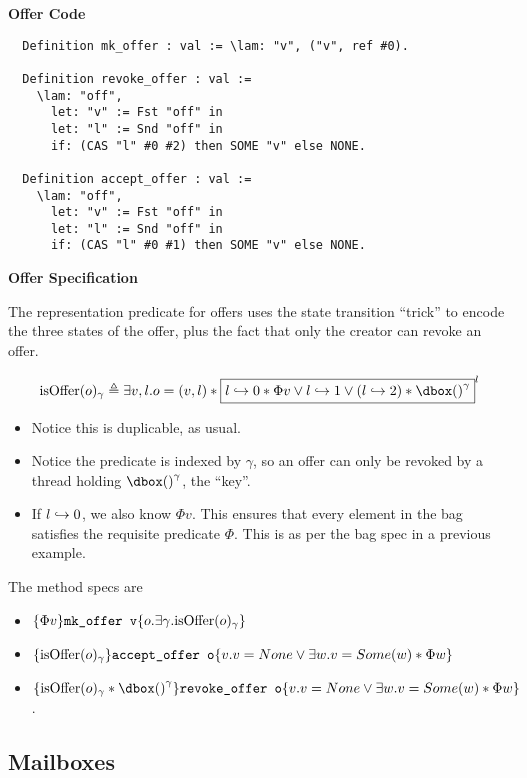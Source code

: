 \textbf{Offer Code}

\begin{verbatim}
  Definition mk_offer : val := \lam: "v", ("v", ref #0).

  Definition revoke_offer : val :=
    \lam: "off",
      let: "v" := Fst "off" in
      let: "l" := Snd "off" in
      if: (CAS "l" #0 #2) then SOME "v" else NONE.

  Definition accept_offer : val :=
    \lam: "off",
      let: "v" := Fst "off" in
      let: "l" := Snd "off" in
      if: (CAS "l" #0 #1) then SOME "v" else NONE.
\end{verbatim}

\textbf{Offer Specification}

The representation predicate for offers uses the state transition ``trick'' to encode the three states of the offer, plus the fact that only the creator can revoke an offer.

\[
\isoffer{o}{\gamma} \triangleq \exists v, l. o = (v, l) * \invm{\pointsto{l}{0} * \Phi v \lor \pointsto{l}{1} \lor (\pointsto{l}{2}) * \ownr{()}{\gamma}}{l}
\]

\begin{itemize}
\item Notice this is duplicable, as usual.
\item Notice the predicate is indexed by $\gamma$, so an offer can only be revoked by a thread holding $\ownr{()}{\gamma}$, the ``key''.
\item If $l \hookrightarrow 0$, we also know $\Phi v$. This ensures that every element in the bag satisfies the requisite predicate $\Phi$. This is as per the bag spec in a previous example.
\end{itemize}

The method specs are
\begin{itemize}

\item $\{\Phi v\} \texttt{mk\_offer v} \{o. \exists \gamma. \text{isOffer}(o)_{\gamma}\}$

\item $\{\text{isOffer}(o)_{\gamma}\} \texttt{accept\_offer o} \{v. v = None \lor \exists w. v = Some(w) * \Phi w \}$

\item $\hot{\isoffer{o}{\gamma} * \ownr{()}{\gamma}}{\texttt{revoke\_offer o}}{v. v = None \lor \exists w. v = Some(w) * \Phi w }$. 
\end{itemize}

\subsection{Mailboxes}